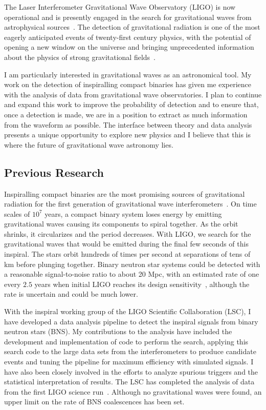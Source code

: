 The Laser Interferometer Gravitational Wave Observatory (LIGO) is now
operational and is presently engaged in the search for gravitational
waves from astrophysical sources~\cite{Abramovici:1992ah,Barish:1999}. The
detection of gravitational radiation is one of the most eagerly anticipated
events of twenty-first century physics, with the potential of opening a new
window on the universe and bringing unprecedented information about the
physics of strong gravitational fields~\cite{Thorne:1997ut}.

I am particularly interested in gravitational waves as an astronomical tool.
My work on the detection of inspiralling compact binaries has given me
experience with the analysis of data from gravitational wave observatories. I
plan to continue and expand this work to improve the probability of detection
and to ensure that, once a detection is made, we are in a position to extract
as much information from the waveform as possible. The interface between theory
and data analysis presents a unique opportunity to explore new physics and I
believe that this is where the future of gravitational wave astronomy lies.



\subsection{Previous Research}

Inspiralling compact binaries are the most promising sources of gravitational
radiation for the first generation of gravitational wave
interferometers~\cite{Belczynski:2002}.  On time scales of $10^7$ years, a
compact binary system loses energy by emitting gravitational waves causing its
components to spiral together. As the orbit shrinks, it circularizes and the
period decreases. With LIGO, we search for the gravitational waves that would
be emitted during the final few seconds of this inspiral. The stars orbit
hundreds of times per second at separations of tens of km before plunging
together. Binary neutron star systems could be detected with a reasonable
signal-to-noise ratio to about 20 Mpc, with an estimated rate of one every
$2.5$ years when initial LIGO reaches its design 
sensitivity~\cite{Kalogera:2000dz,Cutler:2001}, although the rate is uncertain
and could be much lower.

With the inspiral working group of the LIGO Scientific Collaboration (LSC), I
have developed a data analysis pipeline to detect the inspiral signals from
binary neutron stars (BNS). My contributions to the analysis have included the
development and implementation of code to perform the search, applying this
search code to the large data sets from the interferometers to produce
candidate events and tuning the pipeline for maximum efficiency with simulated
signals. I have also been closely involved in the efforts to analyze spurious
triggers and the statistical interpretation of results. The LSC has completed
the analysis of data from the first LIGO science run~\cite{Abbott:2003pj}.
Although no gravitational waves were found, an upper limit on the rate of BNS
coalescences has been set.

